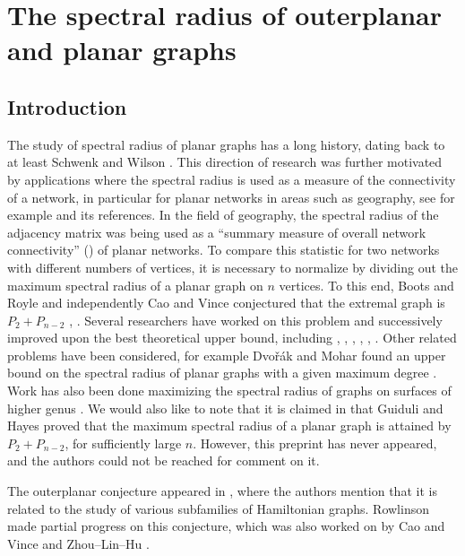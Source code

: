 \chapter{The spectral radius of outerplanar and planar graphs}
\section{Introduction}

The study of spectral radius of planar graphs has a long history, dating back to at least Schwenk
and Wilson \cite{SchwenkWilson1978}.  This direction
of research was further motivated by applications where the spectral
radius is used as a measure of the connectivity of a network, in
particular for planar
networks in areas such as geography, see for example \cite{BootsRoyle1991}
and its references.  In the field of geography, the spectral radius of the adjacency
matrix was being used as a ``summary measure of overall network connectivity'' (\cite{BootsRoyle1991})
of planar networks. 
To compare this statistic for two networks with different numbers of vertices, it is
necessary to normalize by dividing out the maximum spectral radius of a planar graph on
$n$ vertices.
To this end, Boots and Royle and
independently Cao and Vince conjectured that the extremal graph is $P_2 + P_{n-2}$
\cite{BootsRoyle1991}, \cite{CaoVince1993}. Several researchers have worked on this problem and
successively improved upon the best theoretical upper bound, including \cite{Hong1988},
\cite{CaoVince1993}, \cite{Hong1995}, \cite{Guiduli1996}, \cite{Hong1998},
\cite{EllinghamZha2000}. Other related problems have been considered, for example Dvo\v{r}\'{a}k
and Mohar found an upper bound on the spectral radius of planar graphs
with a given maximum degree \cite{DvorakMohar2010}. Work has also been done maximizing the spectral radius of graphs on surfaces of higher genus \cite{EllinghamZha2000, Hong1995, Hong1998}. We would also like to note that it is claimed in \cite{EllinghamZha2000} that Guiduli and Hayes proved
that the maximum spectral radius of a planar graph is attained by $P_2 + P_{n-2}$,
for sufficiently large $n$. However, this preprint has never appeared, and the authors
could not be reached for comment on it.


The outerplanar conjecture appeared
in \cite{CvetkovicRowlinson1990}, where the authors mention that it is related
to the study of various subfamilies of Hamiltonian graphs.
Rowlinson \cite{Rowlinson1990} made partial progress on this conjecture, which
was also worked on by Cao and Vince \cite{CaoVince1993} and Zhou--Lin--Hu \cite{ZhouLinHu2001}.


